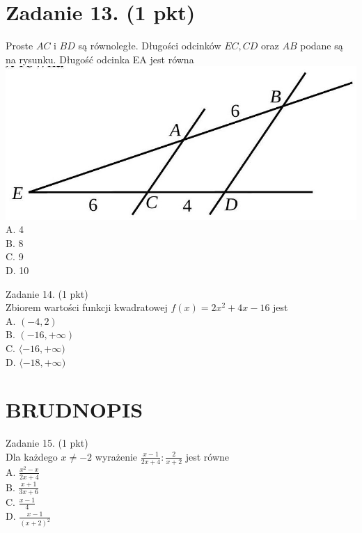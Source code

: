 \documentclass[10pt]{article}
\begin{document}
\section*{Zadanie 13. (1 pkt)}
Proste \(A C\) i \(B D\) są równoległe. Długości odcinków \(E C, C D\) oraz \(A B\) podane są na rysunku. Długość odcinka EA jest równa\\
\includegraphics[max width=\textwidth, center]{2024_11_21_6438f6dbc3784fe6d1deg-04}\\
A. 4\\
B. 8\\
C. 9\\
D. 10

Zadanie 14. (1 pkt)\\
Zbiorem wartości funkcji kwadratowej \(f(x)=2 x^{2}+4 x-16\) jest\\
A. \((-4,2)\)\\
B. \((-16,+\infty)\)\\
C. \(\langle-16,+\infty)\)\\
D. \(\langle-18,+\infty)\)

\section*{BRUDNOPIS}
Zadanie 15. (1 pkt)\\
Dla każdego \(x \neq-2\) wyrażenie \(\frac{x-1}{2 x+4}: \frac{2}{x+2}\) jest równe\\
A. \(\frac{x^{2}-x}{2 x+4}\)\\
B. \(\frac{x+1}{3 x+6}\)\\
C. \(\frac{x-1}{4}\)\\
D. \(\frac{x-1}{(x+2)^{2}}\)
\end{document}
